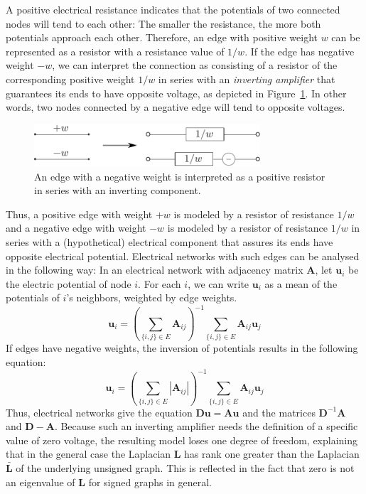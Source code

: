 \documentclass[11pt,a4paper]{book}
\newcommand{\wOnePointFive}{0.75}
\begin{document}
A positive electrical resistance indicates that the potentials
of two connected nodes will tend to each other:  The smaller the
resistance, the more both potentials approach each other.  Therefore, an
edge with positive weight $w$ can be represented as a resistor with
a resistance value of $1/w$. 
If the edge has negative weight $-w$, we can interpret the connection as
consisting of a resistor of the corresponding positive weight $1/w$ in series
with an \emph{inverting amplifier} that guarantees its ends to have
opposite voltage, as depicted in Figure~\ref{fig:elec}.  In other
words, two nodes connected by a negative 
edge will tend to opposite voltages. 

\begin{figure}[h!]
  \centering
  \includegraphics[width=\wOnePointFive\textwidth]{img-svg/elec}
  \caption{ 
    An edge with a negative weight is interpreted as a positive
    resistor in series with an inverting component. 
  }
  \label{fig:elec}
\end{figure}

Thus, a positive edge with weight $+w$ is modeled by a resistor of
resistance $1/w$ and a negative edge with weight $-w$ is modeled by a
resistor of resistance $1/w$ in series with a (hypothetical) electrical
component that assures its ends have opposite electrical potential.
Electrical networks with such edges can be analysed in the following
way: In an electrical network with adjacency matrix $\mathbf A$, let
$\mathbf u_i$ be the electric potential of node $i$.  For
each $i$, we can write $\mathbf u_i$ as a mean of the potentials of
$i$'s neighbors, weighted by edge weights.
\begin{displaymath}
  \mathbf u_i = 
  \left(\sum_{\{i,j\}\in E} \mathbf A_{ij}\right)^{-1}
  \sum_{\{i,j\}\in E} \mathbf A_{ij} \mathbf u_j 
\end{displaymath}
If edges have negative weights, the inversion of potentials results in
the following equation:
\begin{displaymath}
  \mathbf u_i = 
  \left(\sum_{\{i,j\}\in E} |\mathbf A_{ij}|\right)^{-1}
  \sum_{\{i,j\}\in E} \mathbf A_{ij} \mathbf u_j 
\end{displaymath}
Thus, electrical networks give the equation $\mathbf D \mathbf u =
\mathbf A \mathbf u$ and the 
matrices $\mathbf D^{-1}\mathbf A$ and $\mathbf D -\mathbf A$. 
Because such an inverting amplifier needs the definition of a specific
value of zero voltage, the resulting model loses one degree of freedom,
explaining that in the general case the Laplacian $\mathbf L$ has rank
one greater than the Laplacian $\mathbf{\bar L}$ of the underlying unsigned
graph. 
This is reflected in the fact that zero is not an eigenvalue of $\mathbf
L$ for signed graphs in general. 
\end{document}
